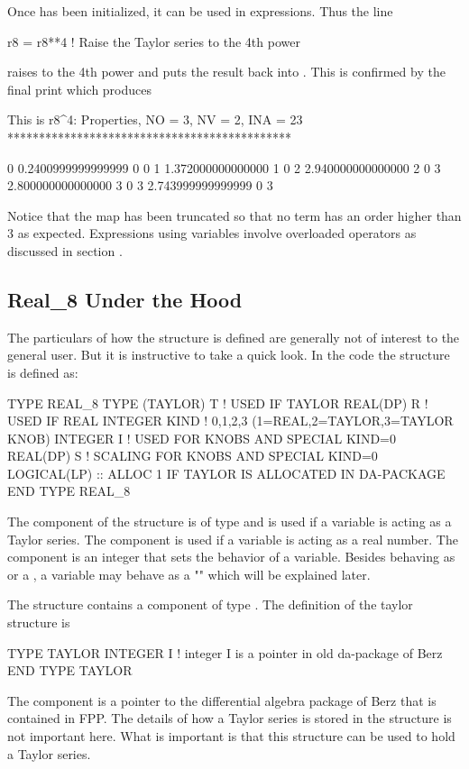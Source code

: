 \documentclass{hitec}     %
\begin{document}
Once  has been initialized, it can be used in expressions. Thus the line
\begin{example}
  r8 = r8**4  ! Raise the Taylor series to the 4th power
\end{example}
raises  to the 4th power and puts the result back into . This is confirmed by the final print which produces
\begin{example}
  This is r8^4:
  Properties, NO =    3, NV =    2, INA =   23
  *********************************************

    0  0.2400999999999999       0  0
    1   1.372000000000000       1  0
    2   2.940000000000000       2  0
    3   2.800000000000000       3  0
    3   2.743999999999999       0  3
\end{example}
Notice that the map has been truncated so that no term has an order higher than 3 as expected. Expressions using  variables involve overloaded operators as discussed in section .

\subsection{Real\_8 Under the Hood}\label{sec:real8}

The particulars of how the  structure is defined are generally not of interest to the general user. But it is instructive to take a quick look. In the  code the  structure is defined as:
\begin{example}
  TYPE REAL_8
     TYPE (TAYLOR) T      !  USED IF TAYLOR
     REAL(DP) R           !    USED IF REAL
     INTEGER KIND  !  0,1,2,3 (1=REAL,2=TAYLOR,3=TAYLOR KNOB)
     INTEGER I   !   USED FOR KNOBS AND SPECIAL KIND=0
     REAL(DP) S   !   SCALING FOR KNOBS AND SPECIAL KIND=0
     LOGICAL(LP) :: ALLOC  1 IF TAYLOR IS ALLOCATED IN DA-PACKAGE
  END TYPE REAL_8
\end{example}
The  component of the structure is of type  and is used if a  variable is acting as a Taylor series. The  component is used if a  variable is acting as a real number. The  component is an integer that sets the behavior of a  variable. Besides behaving as  or a , a  variable may behave as a "" which will be explained later.

The  structure contains a component of type . The definition of the taylor structure is
\begin{example}
  TYPE TAYLOR
     INTEGER I       !  integer I is a pointer in old da-package of Berz
  END TYPE TAYLOR
\end{example}
The component  is a pointer to the differential algebra package of Berz that is contained in FPP. The details of how a Taylor series is stored in the structure is not important here. What is important is that this structure can be used to hold a Taylor series.
\end{document}
